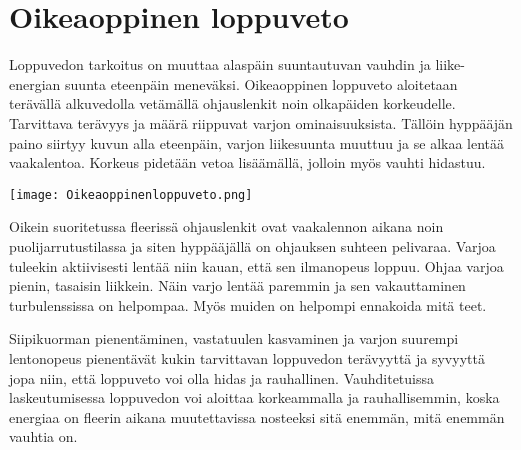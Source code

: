 \section{ Oikeaoppinen loppuveto }
\label{laskeutumistekniikat-oikeaoppinen-loppuveto}


Loppuvedon tarkoitus on muuttaa alaspäin suuntautuvan vauhdin ja liike-energian suunta eteenpäin meneväksi. Oikeaoppinen loppuveto aloitetaan terävällä alkuvedolla vetämällä ohjauslenkit noin olkapäiden korkeudelle. Tarvittava terävyys ja määrä riippuvat varjon ominaisuuksista. Tällöin hyppääjän paino siirtyy kuvun alla eteenpäin, varjon liikesuunta muuttuu ja se alkaa lentää vaakalentoa. Korkeus pidetään vetoa lisäämällä, jolloin myös vauhti hidastuu. 


\begin{Figure}\centering\texttt{[image: Oikeaoppinenloppuveto.png]}\end{Figure} 


Oikein suoritetussa fleerissä ohjauslenkit ovat vaakalennon aikana noin puolijarrutustilassa ja siten hyppääjällä on ohjauksen suhteen pelivaraa. Varjoa tuleekin aktiivisesti lentää niin kauan, että sen ilmanopeus loppuu. Ohjaa varjoa pienin, tasaisin liikkein. Näin varjo lentää paremmin ja sen vakauttaminen turbulenssissa on helpompaa. Myös muiden on helpompi ennakoida mitä teet. 


Siipikuorman pienentäminen, vastatuulen kasvaminen ja varjon suurempi lentonopeus pienentävät kukin tarvittavan loppuvedon terävyyttä ja syvyyttä jopa niin, että loppuveto voi olla hidas ja rauhallinen. Vauhditetuissa laskeutumisessa loppuvedon voi aloittaa korkeammalla ja rauhallisemmin, koska energiaa on fleerin aikana muutettavissa nosteeksi sitä enemmän, mitä enemmän vauhtia on. 

